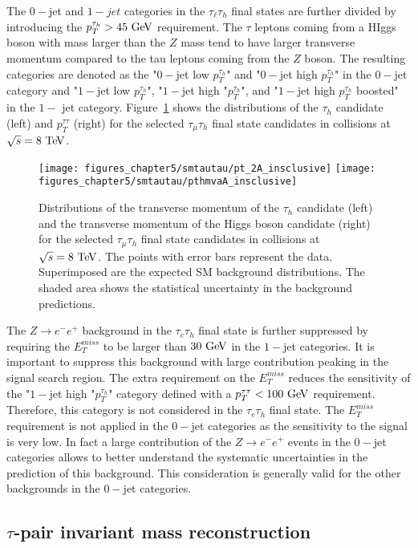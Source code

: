 The $0-$jet and $1-jet$ categories in the $\tau_{\ell}\tau_{h}$ final states are further divided by introducing the $p_{T}^{\tau_h}>45~\mathrm{Ge\kern -0.1em V}$ requirement. The $\tau$ leptons coming from a HIggs boson with mass larger than the $Z$ mass tend to have larger transverse momentum compared to the tau leptons coming from the $Z$ boson. The resulting categories are denoted as the "$0-$jet low $p_{T}^{\tau_h}$" and "$0-$jet high $p_{T}^{\tau_h}$" in the $0-$jet category and  "$1-$jet low $p_{T}^{\tau_h}$", "$1-$jet high "$p_{T}^{\tau_h}$", and "$1-$jet high $p_{T}^{\tau_h}$ boosted" in the $1-$ jet category. Figure~\ref{fig:higgspt} shows the distributions of the $\tau_{h}$ candidate (left) and $p_{T}^{\tau\tau} $ (right) for the selected $\tau_{\mu}\tau_{h}$ final state candidates in collisions at $\sqrt{s}=8~\mathrm{Te\kern -0.1em V}$. 
\begin{figure}[htbp]
\centering
\texttt{[image: figures\_chapter5/smtautau/pt\_2A\_insclusive]}
\texttt{[image: figures\_chapter5/smtautau/pthmvaA\_insclusive]}
\caption{Distributions of the transverse momentum of the $\tau_{h}$ candidate (left)  and the transverse momentum of the Higgs boson candidate (right) for the selected $\tau_{\mu}\tau_{h}$ final state candidates in collisions at $\sqrt{s}=8~\mathrm{Te\kern -0.1em V}$. The points with error bars represent the data. Superimposed are the expected SM background distributions. The shaded area shows the statistical uncertainty in the background predictions.}
\label{fig:higgspt}
\end{figure}
The $Z\rightarrow e^{-}e^{+}$ background in the $\tau_{e}\tau_h$ final state is further suppressed by requiring the $E_{T}^{miss}$ to be larger than $30~\mathrm{Ge\kern -0.1em V}$ in the $1-$jet categories. It is important to suppress this background with large contribution peaking in the signal search region. The extra requirement on the $E_{T}^{miss}$ reduces the sensitivity of the "$1-$jet high "$p_{T}^{\tau_h}$" category defined with a $p_{T}^{\tau\tau}<100~\mathrm{Ge\kern -0.1em V}$ requirement. Therefore, this category is not considered in the $\tau_e\tau_h$ final state. The $E_{T}^{miss}$ requirement is not applied in the $0-$jet categories as the sensitivity to the signal is very low. In fact a large contribution of the $Z\rightarrow e^{-}e^{+}$ events in the $0-$jet categories allows to better understand the systematic uncertainties in the prediction of this background. This consideration is generally valid for the other backgrounds in the $0-$jet categories.

\subsection{$\tau$-pair invariant mass reconstruction}

